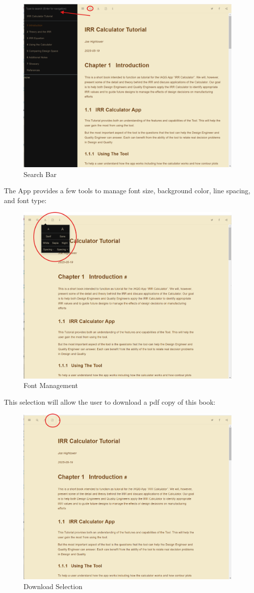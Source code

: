 \documentclass[
]{article}
\begin{document}
\begin{figure}

{\centering \includegraphics[width=0.5\linewidth]{Search Bar} 

}

\caption{Search Bar}\label{fig:unnamed-chunk-4}
\end{figure}

The App provides a few tools to manage font size, background color, line spacing, and font type:

\begin{figure}

{\centering \includegraphics[width=0.5\linewidth]{Font Management} 

}

\caption{Font Management}\label{fig:unnamed-chunk-5}
\end{figure}

This selection will allow the user to download a pdf copy of this book:

\begin{figure}

{\centering \includegraphics[width=0.5\linewidth]{Download Selection} 

}

\caption{Download Selection}\label{fig:unnamed-chunk-6}
\end{figure}
\end{document}
